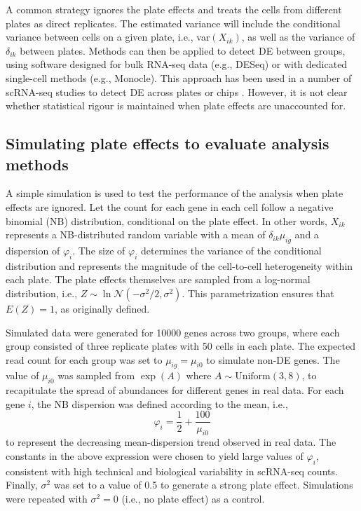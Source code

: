 \documentclass[oupdraft]{bio}
\begin{document}
A common strategy ignores the plate effects and treats the cells from different plates as direct replicates.
The estimated variance will include the conditional variance between cells on a given plate, i.e., var$(X_{ik})$, as well as the variance of $\delta_{ik}$ between plates.
Methods can then be applied to detect DE between groups, using software designed for bulk RNA-seq data (e.g., DESeq) or with dedicated single-cell methods (e.g., Monocle).
This approach has been used in a number of scRNA-seq studies to detect DE across plates or chips \citep{kolod2015single,trapnell2014dynamics,avraham2015pathogen}.
However, it is not clear whether statistical rigour is maintained when plate effects are unaccounted for.


\subsection{Simulating plate effects to evaluate analysis methods}
A simple simulation is used to test the performance of the analysis when plate effects are ignored.
Let the count for each gene in each cell follow a negative binomial (NB) distribution, conditional on the plate effect.
In other words, $X_{ik}$ represents a NB-distributed random variable with a mean of $\delta_{ik}\mu_{ig}$ and a dispersion of $\varphi_{i}$.
The size of $\varphi_{i}$ determines the variance of the conditional distribution and represents the magnitude of the cell-to-cell heterogeneity within each plate.
The plate effects themselves are sampled from a log-normal distribution, i.e., $Z \sim \ln \mathcal{N}(-\sigma^2/2, \sigma^2)$.
This parametrization ensures that $E(Z)=1$, as originally defined.

Simulated data were generated for 10000 genes across two groups, where each group consisted of three replicate plates with 50 cells in each plate.
The expected read count for each group was set to $\mu_{ig}=\mu_{i0}$ to simulate non-DE genes.
The value of $\mu_{i0}$ was sampled from $\exp(A)$ where $A \sim \mbox{Uniform}(3, 8)$, to recapitulate the spread of abundances for different genes in real data. 
For each gene $i$, the NB dispersion was defined according to the mean, i.e., 
\[
    \varphi_{i} = \frac{1}{2} + \frac{100}{\mu_{i0}} 
\]
to represent the decreasing mean-dispersion trend observed in real data.
The constants in the above expression were chosen to yield large values of $\varphi_{i}$, consistent with high technical and biological variability in scRNA-seq counts.
Finally, $\sigma^2$ was set to a value of 0.5 to generate a strong plate effect.
Simulations were repeated with $\sigma^2=0$ (i.e., no plate effect) as a control. 
\end{document}
